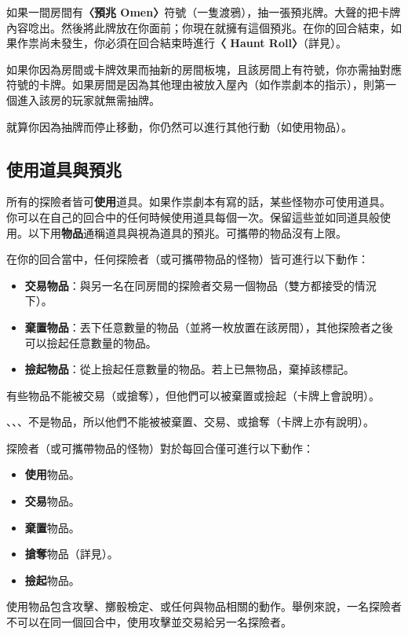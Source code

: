 如果一間房間有\textbf{〈預兆 Omen〉}符號（一隻渡鴉\OmenSymbol{}），抽一張預兆牌。大聲的把卡牌內容唸出。然後將此牌放在你面前；你現在就擁有這個預兆。在你的回合結束，如果作祟尚未發生，你必須在回合結束時進行\textbf{〈 Haunt Roll〉}（詳見）。

如果你因為房間或卡牌效果而抽新的房間板塊，且該房間上有符號，你亦需抽對應符號的卡牌。如果房間是因為其他理由被放入屋內（如作祟劇本的指示），則第一個進入該房的玩家就無需抽牌。

就算你因為抽牌而停止移動，你仍然可以進行其他行動（如使用物品）。


\subsection{使用道具與預兆} \label{ssec:use-item-and-omen-cards}

所有的探險者皆可\textbf{使用}道具。如果作祟劇本有寫的話，某些怪物亦可使用道具。
你可以在自己的回合中的任何時候使用道具每個一次。保留這些並如同道具般使用。以下用\textbf{物品}通稱道具與視為道具的預兆。可攜帶的物品沒有上限。

在你的回合當中，任何探險者（或可攜帶物品的怪物）皆可進行以下動作：
\begin{itemize}
  \item \textbf{交易物品}：與另一名在同房間的探險者交易一個物品（雙方都接受的情況下）。
  \item \textbf{棄置物品}：丟下任意數量的物品（並將一枚放置在該房間），其他探險者之後可以撿起任意數量的物品。
  \item \textbf{撿起物品}：從上撿起任意數量的物品。若上已無物品，棄掉該標記。
\end{itemize}
有些物品不能被交易（或搶奪），但他們可以被棄置或撿起（卡牌上會說明）。

、、、不是物品，所以他們不能被被棄置、交易、或搶奪（卡牌上亦有說明）。

探險者（或可攜帶物品的怪物）對於每回合僅可進行以下動作：
\begin{itemize}
  \item \textbf{使用}物品。
  \item \textbf{交易}物品。
  \item \textbf{棄置}物品。
  \item \textbf{搶奪}物品（詳見）。
  \item \textbf{撿起}物品。
\end{itemize}
使用物品包含攻擊、擲骰檢定、或任何與物品相關的動作。舉例來說，一名探險者不可以在同一個回合中，使用攻擊並交易給另一名探險者。

